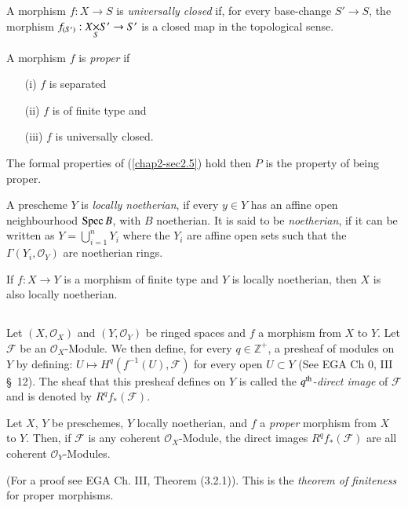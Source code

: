 \begin{defin}\label{chap2-defi2.7.1}%
A morphism $f:X\to S$ is {\em universally closed} if, for every
base-change $S'\to S$, the morphism $f_{(S')}:\fprod{X}{S'}{S}\to S'$
is a closed map in the topological sense.
\end{defin}

\begin{defin}\label{chap2-defi2.7.2}%
A morphism $f$ is {\em proper} if
\begin{itemize}
\item[\rm(i)] $f$ is separated

\item[\rm(ii)] $f$ is of finite type and

\item[\rm(iii)] $f$ is universally closed.
\end{itemize}
\end{defin}

The formal properties of (\ref{chap2-sec2.5}) hold then $P$ is the
property of being proper.

\begin{defin}\label{chap2-defi2.7.3}%
A prescheme $Y$ is {\em locally noetherian}, if every $y\in Y$ has an
affine open neighbourhood $\operatorname{Spec} B$, with $B$ noetherian. It is said
to be {\em noetherian}, if it can be written as\pageoriginale
$Y=\bigcup\limits^{n}_{i=1}Y_{i}$ where the $Y_{i}$ are affine open
sets such that the $\Gamma(Y_{i},\mathscr{O}_{Y})$ are noetherian rings.
\end{defin}

If $f:X\to Y$ is a morphism of finite type and $Y$ is locally
noetherian, then $X$ is also locally noetherian.

\setcounter{subsection}{3}
\subsection{}\label{chap2-sec2.7.4}%
Let $(X,\mathscr{O}_{X})$ and $(Y,\mathscr{O}_{Y})$ be ringed spaces
and $f$ a morphism from $X$ to $Y$. Let $\mathscr{F}$ be an
$\mathscr{O}_{X}$-Module. We then define, for every
$q\in\mathbb{Z}^{+}$, a presheaf of modules on $Y$ by defining:
$U\mapsto H^{q}(f^{-1}(U),\mathscr{F})$ for every open $U\subset Y$
(See EGA Ch 0, III \S\ 12). The sheaf that this presheaf defines on
$Y$ is called the $q^{\rm th}$-{\em direct image} of $\mathscr{F}$ and
is denoted by $R^{q}f_{\ast}(\mathscr{F})$.

\setcounter{theorem}{4}
\begin{theorem}\label{chap2-thm2.7.5}%
Let $X$, $Y$ be preschemes, $Y$ locally noetherian, and $f$ a {\em
  proper} morphism from $X$ to $Y$. Then, if $\mathscr{F}$ is any
coherent $\mathscr{O}_{X}$-Module, the direct images
$R^{q}f_{\ast}(\mathscr{F})$ are all coherent
$\mathscr{O}_{Y}$-Modules. 
\end{theorem}

(For a proof see EGA Ch. III, Theorem (3.2.1)). This is the {\em
  theorem of finiteness} for proper morphisms.
